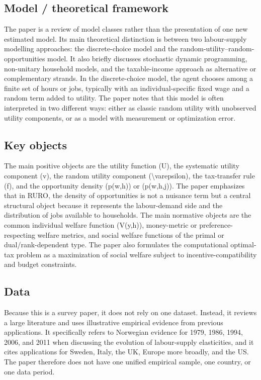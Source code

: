 \documentclass[11pt,a4paper]{article}
\begin{document}
\subsection*{Model / theoretical framework}
The paper is a review of model classes rather than the presentation of one new estimated model. Its main theoretical distinction is between two labour-supply modelling approaches: the discrete-choice model and the random-utility–random-opportunities model. It also briefly discusses stochastic dynamic programming, non-unitary household models, and the taxable-income approach as alternative or complementary strands. In the discrete-choice model, the agent chooses among a finite set of hours or jobs, typically with an individual-specific fixed wage and a random term added to utility. The paper notes that this model is often interpreted in two different ways: either as classic random utility with unobserved utility components, or as a model with measurement or optimization error.

\subsection*{Key objects}
The main positive objects are the utility function (U), the systematic utility component (v), the random utility component (\textbackslash{}varepsilon), the tax-transfer rule (f), and the opportunity density (p(w,h)) or (p(w,h,j)). The paper emphasizes that in RURO, the density of opportunities is not a nuisance term but a central structural object because it represents the labour-demand side and the distribution of jobs available to households. The main normative objects are the common individual welfare function (V(y,h)), money-metric or preference-respecting welfare metrics, and social welfare functions of the primal or dual/rank-dependent type. The paper also formulates the computational optimal-tax problem as a maximization of social welfare subject to incentive-compatibility and budget constraints.

\subsection*{Data}
Because this is a survey paper, it does not rely on one dataset. Instead, it reviews a large literature and uses illustrative empirical evidence from previous applications. It specifically refers to Norwegian evidence for 1979, 1986, 1994, 2006, and 2011 when discussing the evolution of labour-supply elasticities, and it cites applications for Sweden, Italy, the UK, Europe more broadly, and the US. The paper therefore does not have one unified empirical sample, one country, or one data period.
\end{document}
